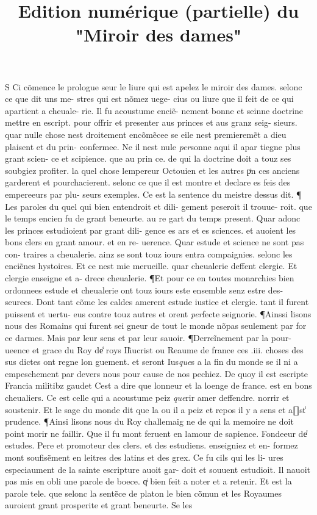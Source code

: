 \documentclass{article}
\begin{document}
\date{}
        \title{Edition numérique (partielle) du "Miroir des dames"}
\maketitle

\begin{pages} 
\beginnumbering
        S Ci cõmence le prologue seur le liure qui est apelez le miroir des dames. selonc ce que dit uns me- stres qui est nõmez uege- cius ou liure que il feit de ce qui apartient a cheuale- rie. Il fu acoustume enciẽ- nement bonne et seinne doctrine mettre en escript. pour offrir et presenter aus princes et aus granz seig- sieurs. quar nulle chose nest droitement encõmẽcee se eile nest premieremẽt a dieu plaisent et du prin-  confermee. Ne il nest nule \textit{per}sonne aqui il apar tiegne plus grant scien- ce et scipience. que au prin ce. de qui la doctrine doit a touz ses soubgiez profiter. la quel chose lempereur Octouien et les autres pͥn ces anciens garderent et pourchacierent. selonc ce que il est montre et declare es feis des empereeurs par plu- seurs exemples. Ce est la sentence du meistre dessus dit. ¶ Les paroles du quel qui bien entendroit et dili- gement peseroit il trouue- roit. que le temps encien fu de grant beneurte. au re gart du temps present. Quar adonc les princes estudioient par grant dili- gence es ars et es sciences. et auoient les bons clers en grant amour. et en re- uerence. Quar estude et science ne sont pas con- traires a cheualerie. ainz se sont touz iours entra compaignies. selonc les enciẽnes hystoires. Et ce nest mie merueille. quar cheualerie deffent clergie. Et clergie enseigne et a- drece cheualerie. ¶Et pour ce en toutes monarchies bien ordonnees estude et cheualerie ont touz iours este ensemble senz estre des- seurees. Dont tant cõme les caldes amerent estude iustice et clergie. tant il furent puissent et uertu- eus contre touz autres et orent \textit{per}fecte seignorie. ¶Ainssi lisons nous des Romains qui furent sei gneur de tout le monde nõpas seulement par for ce darmes. Mais par leur sens et par leur sauoir. ¶Derreĩnement par la pour- ueence et grace du Roy de̾ roys Ih̃ucrist ou Reaume de france ces .iii. choses des sus dictes ont regne lon guement. et seront Ius\textit{que}s a la fin du monde se il ni a empeschement par devers nous pour cause de nos pechiez. De quoy il est escripte Francia militibz gaudet Cest a dire que lonneur et la loenge de france. est en bons cheualiers. Ce est celle qui a acoustume peiz \textit{que}rir amer deffendre. norrir et soustenir. Et le sage du monde dit que la ou il a peiz et repos il y a sens et a⟦⟧st̾ prudence. ¶Ainsi lisons nous du Roy challemaig ne de qui la memoire ne doit point morir ne faillir. Que il fu mont feruent en lamour de sapience. Fondeeur de̾ estudes. Pere et promoteur des clers. et des estudiens. enseigniez et en- formez mont soufisẽment en leitres des latins et des grex. Ce fu cils qui les li- ures especiaument de la sainte escripture auoit gar- doit et souuent estudioit. Il nauoit pas mis en obli une parole de boece. qͥ bien feit a noter et a retenir. Et est la parole tele. que selonc la sentẽce de platon le bien cõmun et les Royaumes auroient grant prosperite et grant beneurte. Se les 
\end{pages}
\end{document}

